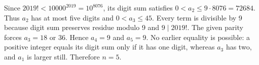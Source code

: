 Since $2019!<10000^{2019}=10^{8076}$, its digit sum satisfies $0<a_2\le9\cdot8076=72684$. Thus $a_2$ has at most five digits and $0<a_3\le45$. Every term is divisible by 9 because digit sum preserves residue modulo 9 and $9\mid2019!$. The given parity forces $a_3=18$ or 36. Hence $a_4=9$ and $a_5=9$. No earlier equality is possible: a positive integer equals its digit sum only if it has one digit, whereas $a_3$ has two, and $a_1$ is larger still. Therefore $\boxed{n=5}$.
